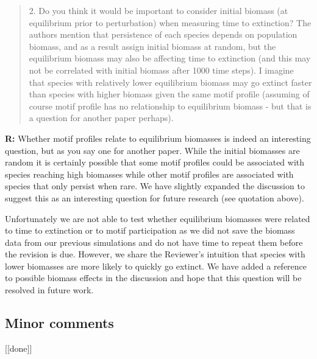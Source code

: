 \documentclass[12pt]{article}
\begin{document}

    \smallskip

    \begin{quotation}
      2. Do you think it would be important to consider initial biomass (at equilibrium prior to perturbation) when measuring time to extinction? The authors mention that persistence of each species depends on population biomass, and as a result assign initial biomass at random, but the equilibrium biomass may also be affecting time to extinction (and this may not be correlated with initial biomass after 1000 time steps). I imagine that species with relatively lower equilibrium biomass may go extinct faster than species with higher biomass given the same motif profile (assuming of course motif profile has no relationship to equilibrium biomass - but that is a question for another paper perhaps).   
    \end{quotation}

    \smallskip

    \textbf{R:} Whether motif profiles relate to equilibrium biomasses is indeed an interesting question, but as you say one for another paper. While the initial biomasses are random it is certainly possible that some motif profiles could be associated with species reaching high biomasses while other motif profiles are associated with species that only persist when rare. We have slightly expanded the discussion to suggest this as an interesting question for future research (see quotation above).


    Unfortunately we are not able to test whether equilibrium biomasses were related to time to extinction or to motif participation as we did not save the biomass data from our previous simulations and do not have time to repeat them before the revision is due. However, we share the Reviewer's intuition that species with lower biomasses are more likely to quickly go extinct. We have added a reference to possible biomass effects in the discussion and hope that this question will be resolved in future work.


    \smallskip


  \subsection*{Minor comments} [[done]]
\end{document}
